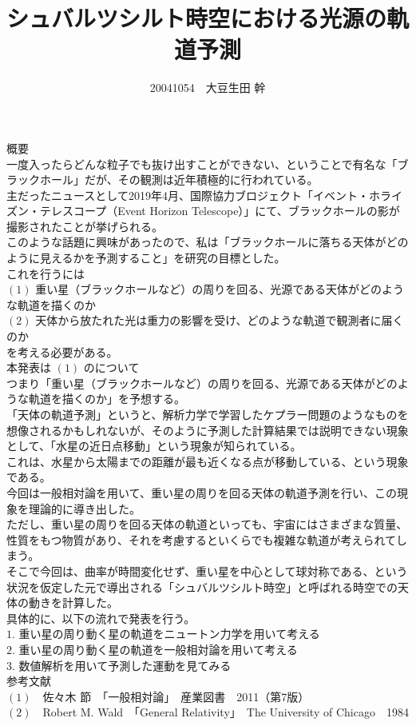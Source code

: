 \documentclass[dvipdfmx]{article} %
\title{シュバルツシルト時空における光源の軌道予測}
\author{20041054　大豆生田 幹}
\date{}
\begin{document}
\maketitle 
概要\\

\noindent
一度入ったらどんな粒子でも抜け出すことができない、ということで有名な「ブラックホール」だが、その観測は近年積極的に行われている。\\
主だったニュースとして2019年4月、国際協力ブロジェクト「イベント・ホライズン・テレスコープ（Event Horizon Telescope）」にて、ブラックホールの影が撮影されたことが挙げられる。\\

\noindent
このような話題に興味があったので、私は「ブラックホールに落ちる天体がどのように見えるかを予測すること」を研究の目標とした。\\
これを行うには\\
\indent
$(1)$ 重い星（ブラックホールなど）の周りを回る、光源である天体がどのような軌道を描くのか\\
\indent
$(2)$ 天体から放たれた光は重力の影響を受け、どのような軌道で観測者に届くのか\\
を考える必要がある。\\

\noindent
本発表は $(1)$ のについて\\
つまり「重い星（ブラックホールなど）の周りを回る、光源である天体がどのような軌道を描くのか」を予想する。\\

\noindent
「天体の軌道予測」というと、解析力学で学習したケプラー問題のようなものを想像されるかもしれないが、そのように予測した計算結果では説明できない現象として、「水星の近日点移動」という現象が知られている。\\
これは、水星から太陽までの距離が最も近くなる点が移動している、という現象である。\\
今回は一般相対論を用いて、重い星の周りを回る天体の軌道予測を行い、この現象を理論的に導き出した。\\

\noindent
ただし、重い星の周りを回る天体の軌道といっても、宇宙にはさまざまな質量、性質をもつ物質があり、それを考慮するといくらでも複雑な軌道が考えられてしまう。\\
そこで今回は、曲率が時間変化せず、重い星を中心として球対称である、という状況を仮定した元で導出される「シュバルツシルト時空」と呼ばれる時空での天体の動きを計算した。\\

具体的に、以下の流れで発表を行う。\\
\indent
$1.$ 重い星の周り動く星の軌道をニュートン力学を用いて考える\\
\indent
$2.$ 重い星の周り動く星の軌道を一般相対論を用いて考える\\
\indent
$3.$ 数値解析を用いて予測した運動を見てみる\\

参考文献\\
$(1)$　佐々木 節　「一般相対論」　産業図書　2011（第7版）\\
$(2)$　Robert M. Wald　「General Relativity」　The University of Chicago　1984
\end{document}
